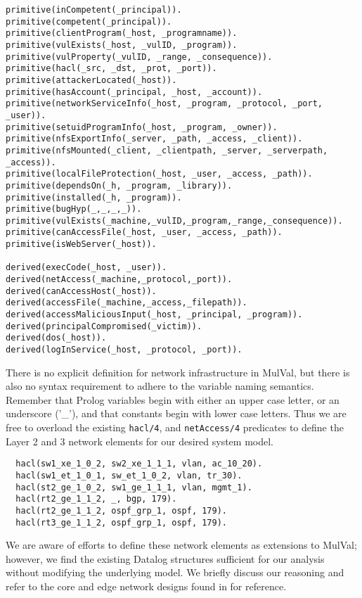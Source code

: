 \begin{lstlisting}[style=datalog, label={lst:mulval_primitives}, caption={Mulval Primitive and Derived Facts}]
primitive(inCompetent(_principal)).
primitive(competent(_principal)).
primitive(clientProgram(_host, _programname)).
primitive(vulExists(_host, _vulID, _program)).
primitive(vulProperty(_vulID, _range, _consequence)).
primitive(hacl(_src, _dst, _prot, _port)).
primitive(attackerLocated(_host)).
primitive(hasAccount(_principal, _host, _account)).
primitive(networkServiceInfo(_host, _program, _protocol, _port, _user)).
primitive(setuidProgramInfo(_host, _program, _owner)).
primitive(nfsExportInfo(_server, _path, _access, _client)).
primitive(nfsMounted(_client, _clientpath, _server, _serverpath, _access)).
primitive(localFileProtection(_host, _user, _access, _path)).
primitive(dependsOn(_h, _program, _library)).
primitive(installed(_h, _program)).
primitive(bugHyp(_,_,_,_)).
primitive(vulExists(_machine,_vulID,_program,_range,_consequence)).
primitive(canAccessFile(_host, _user, _access, _path)).
primitive(isWebServer(_host)).

derived(execCode(_host, _user)).
derived(netAccess(_machine,_protocol,_port)).
derived(canAccessHost(_host)).
derived(accessFile(_machine,_access,_filepath)).
derived(accessMaliciousInput(_host, _principal, _program)).
derived(principalCompromised(_victim)).
derived(dos(_host)).
derived(logInService(_host, _protocol, _port)).
\end{lstlisting}

There is no explicit definition for network infrastructure in MulVal, but there is also no syntax requirement to adhere to the variable naming semantics. Remember that Prolog variables begin with either an upper case letter, or an underscore ('\_'),  and that constants begin with lower case letters. Thus we are free to overload the existing \verb|hacl/4|, and \verb|netAccess/4| predicates to define the Layer 2 and 3 network elements for our desired system model.

\begin{verbatim}
  hacl(sw1_xe_1_0_2, sw2_xe_1_1_1, vlan, ac_10_20).   
  hacl(sw1_et_1_0_1, sw_et_1_0_2, vlan, tr_30). 
  hacl(st2_ge_1_0_2, sw1_ge_1_1_1, vlan, mgmt_1). 
  hacl(rt2_ge_1_1_2, _, bgp, 179). 
  hacl(rt2_ge_1_1_2, ospf_grp_1, ospf, 179).
  hacl(rt3_ge_1_1_2, ospf_grp_1, ospf, 179).
\end{verbatim}

We are aware of efforts\cite{Bacic_Froh_Henderson_2006,Henderson_Bacic_Froh_2005} to define these network elements as extensions to MulVal; however, we find the existing Datalog structures sufficient for our analysis without modifying the underlying model. We briefly discuss our reasoning and refer to the core and edge network designs found in \cite{Donovan_Prabhu_2017} for reference. 

